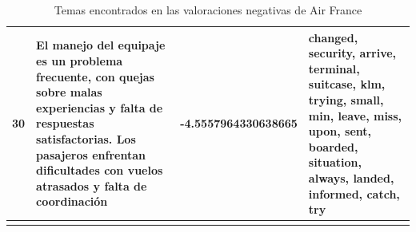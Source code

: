 \documentclass{report}
\begin{document}
\begin{longtable}{|p{1cm}|p{4cm}|p{4cm}|p{6cm}|}
                    \hline
                    30 & El manejo del equipaje es un problema frecuente, con quejas sobre malas experiencias y falta de respuestas satisfactorias. Los pasajeros enfrentan dificultades con vuelos atrasados y falta de coordinación & -4.5557964330638665 & changed, security, arrive, terminal, suitcase, klm, trying, small, min, leave, miss, upon, sent, boarded, situation, always, landed, informed, catch, try \\
                    \hline
                    \caption{Temas encontrados en las valoraciones negativas de Air France}
                \end{longtable} 
\end{document}
